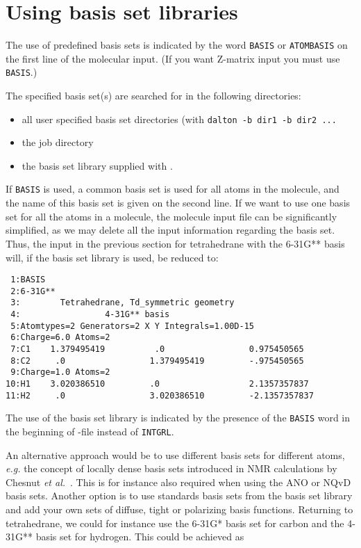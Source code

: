 \section{Using basis set libraries}\label{sec:molbasis}

The use of predefined basis sets is indicated
by the word {\tt BASIS} or {\tt ATOMBASIS} on the first line of the
molecular input.
(If you want Z-matrix input you must use {\tt BASIS}.)

The specified basis set(s) are searched for in the following directories:
\begin{itemize}
\item all user specified basis set directories (with {\tt dalton -b dir1 -b dir2 ...}
\item the job directory
\item the basis set library supplied with \dalton.
\end{itemize}

If {\tt BASIS} is used, a common basis set is used for all atoms in
the molecule, and the name of this basis set is given on the second line.
If we want to use one basis set for all the
atoms in a molecule, the molecule input file can be significantly
simplified, as we may delete all the input information regarding the
basis set. Thus, the input in the previous section for tetrahedrane
with the 6-31G** basis will, if the basis set library is used,  be reduced
to:

\begin{verbatim}
 1:BASIS
 2:6-31G**
 3:        Tetrahedrane, Td_symmetric geometry
 4:                 4-31G** basis
 5:Atomtypes=2 Generators=2 X Y Integrals=1.00D-15
 6:Charge=6.0 Atoms=2
 7:C1    1.379495419          .0                 0.975450565
 8:C2     .0                 1.379495419         -.975450565
 9:Charge=1.0 Atoms=2
10:H1    3.020386510         .0                  2.1357357837
11:H2     .0                 3.020386510         -2.1357357837
\end{verbatim}

The use of the basis set library is indicated by the presence of the
\verb|BASIS| word in the beginning of \mol-file instead of
\verb|INTGRL|.

An alternative approach would be to use different basis sets for
different atoms, {\it e.g.\/} the concept of locally
dense basis sets
introduced in NMR calculations by Chesnut {\it et
al.\/}~\cite{dbcberkdmdaejcc14}. This is for instance also required
when using the ANO or
NQvD
basis sets. Another option is to use
standards basis sets from the basis set 
library and add your own sets
of diffuse, tight or polarizing basis
functions. Returning to
tetrahedrane, we could for instance use the 6-31G* basis set for
carbon and the 4-31G** basis set for hydrogen. This could be achieved
as

